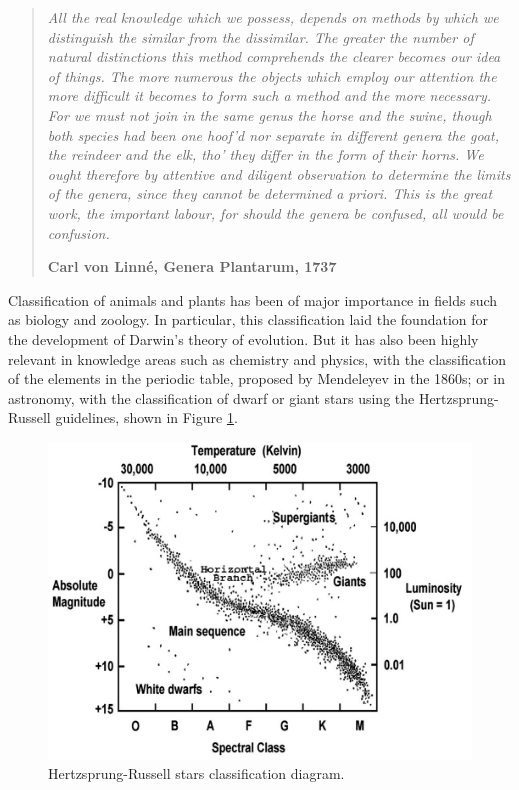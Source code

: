 \begin{quotation}{\slshape
		All the real knowledge which we possess, depends on methods by which we distinguish the similar from the dissimilar. The greater the number of natural distinctions this method comprehends the clearer becomes our idea of things. The
		more numerous the objects which employ our attention the more difficult it becomes to
		form such a method and the more necessary.
		For we must not join in the same genus the horse and the swine, though both species
		had been one hoof’d nor separate in different genera the goat, the reindeer and the elk,
		tho’ they differ in the form of their horns. We ought therefore by attentive and diligent
		observation to determine the limits of the genera, since they cannot be determined a
		priori. This is the great work, the important labour, for should the genera be confused,
		all would be confusion.} 
		\begin{flushright}
			\textbf{Carl von Linné, Genera Plantarum, 1737}
		\end{flushright}
\end{quotation}

Classification of animals and plants has been of major importance in fields such as biology and zoology. In particular, this classification laid the foundation for the development of Darwin's theory of evolution. But it has also been highly relevant in knowledge areas such as chemistry and physics, with the classification of the elements in the periodic table, proposed by Mendeleyev in the 1860s; or in astronomy, with the classification of dwarf or giant stars using the Hertzsprung-Russell guidelines, shown in Figure \ref{fig:intro_HRdiagram}.

\begin{figure}[!h]
	\centering
	\includegraphics[scale=0.35]{gfx/Intro/HR_diagram} 
	\caption{Hertzsprung-Russell stars classification diagram.}\label{fig:intro_HRdiagram}
\end{figure}

